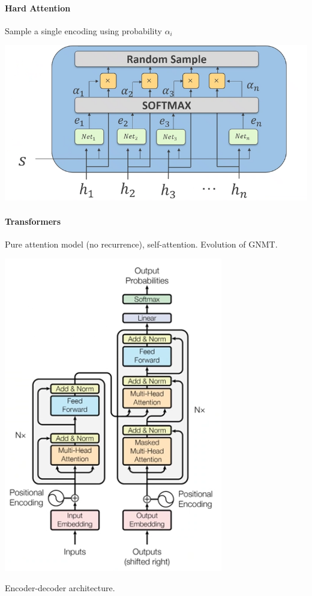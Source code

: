 \documentclass[10pt]{report}
\begin{document}
\paragraph{Hard Attention} Sample a single encoding using probability $\alpha_i$
\begin{center}
	\includegraphics[scale=0.5]{117.png}
\end{center}
\paragraph{Transformers} Pure attention model (no recurrence), self-attention. Evolution of GNMT.
\begin{center}
	\includegraphics[scale=0.5]{118.png}
\end{center}
Encoder-decoder architecture.
\end{document}

